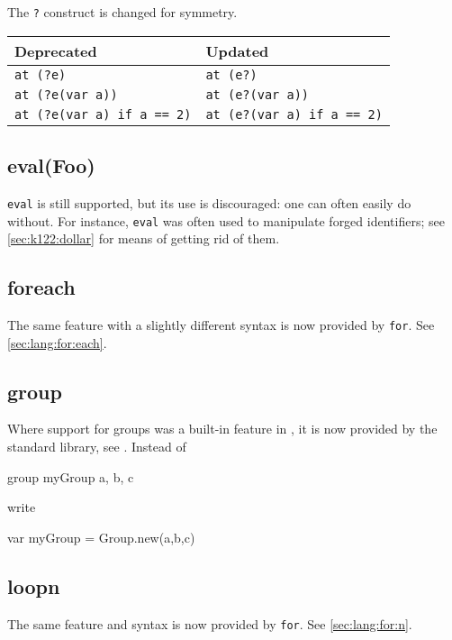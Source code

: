 The \lstinline{?} construct is changed for symmetry.

\begin{center}
  \begin{tabular}{|l|l|}
    \hline
    \textbf{Deprecated} & \textbf{Updated}  \\
    \hline
    \lstinline|at (?e)|                  & \lstinline|at (e?)|\\
    \lstinline|at (?e(var a))|           & \lstinline|at (e?(var a))|\\
    \lstinline|at (?e(var a) if a == 2)| & \lstinline|at (e?(var a) if a == 2)|\\
    \hline
  \end{tabular}
\end{center}


\subsection{eval(Foo)}
\lstinline{eval} is still supported, but its use is discouraged: one
can often easily do without.  For instance, \lstinline{eval} was often
used to manipulate forged identifiers; see \autoref{sec:k122:dollar}
for means of getting rid of them.

\subsection{foreach}
The same feature with a slightly different syntax is now provided by
\lstinline|for|.  See \autoref{sec:lang:for:each}.

\subsection{group}
Where support for groups was a built-in feature in , it is now
provided by the standard library, see .  Instead of
\begin{urbiunchecked}
group myGroup {a, b, c}
\end{urbiunchecked}
\noindent
write
\begin{urbiunchecked}
var myGroup = Group.new(a,b,c)
\end{urbiunchecked}

\subsection{loopn}
The same feature and syntax is now provided by \lstinline|for|.  See
\autoref{sec:lang:for:n}.

